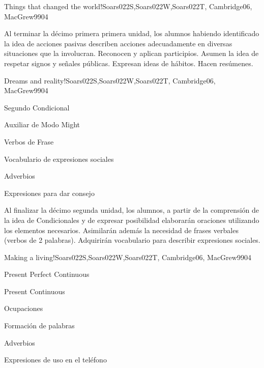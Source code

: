 \begin{syllabus}
\begin{unit}{Things that changed the world!}{Soars022S,Soars022W,Soars022T, Cambridge06, MacGrew99}{0}{4}
   \begin{unitgoals}
      \item Al terminar la décimo primera primera unidad, los alumnos habiendo identificado la idea de acciones pasivas describen acciones adecuadamente en diversas situaciones que la involucran. Reconocen y aplican participios. Asumen la idea de respetar signos y señales públicas. Expresan ideas de hábitos. Hacen resúmenes.
   \end{unitgoals}
\end{unit}

\begin{unit}{Dreams and reality!}{Soars022S,Soars022W,Soars022T, Cambridge06, MacGrew99}{0}{4}
   \begin{topics}
      \item Segundo Condicional
      \item Auxiliar de Modo Might
      \item Verbos de Frase
      \item Vocabulario de expresiones sociales
      \item Adverbios
      \item Expresiones para dar consejo
   \end{topics}

   \begin{unitgoals}
      \item Al finalizar la décimo segunda unidad, los alumnos, a partir de la comprensión de la idea de Condicionales y de expresar posibilidad elaborarán oraciones utilizando los elementos necesarios. Asimilarán además la necesidad de frases verbales (verbos de 2 palabras). Adquirirán vocabulario para describir expresiones sociales.
   \end{unitgoals}
\end{unit}

\begin{unit}{Making a living!}{Soars022S,Soars022W,Soars022T, Cambridge06, MacGrew99}{0}{4}
   \begin{topics}
      \item Present Perfect Continuous
      \item Present Continuous
      \item Ocupaciones 
      \item Formación de palabras
      \item Adverbios
      \item Expresiones de uso en el teléfono
   \end{topics}


\end{unit}
\end{syllabus}
